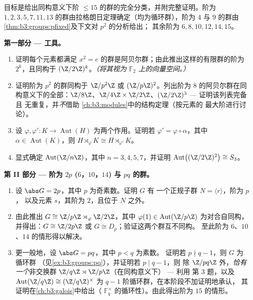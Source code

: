 \begin{problem}\label{pb:b3:groups:1}
目标是给出同构意义下阶
$\leq 15$ 的群的完全分类，并附完整证明。阶为 $1, 2, 3, 5,
7, 11, 13$ 的群由拉格朗日定理确定（均为循环群），阶为 $4$ 与
$9$ 的群由\cref{thm:b3:groups:pfixed}及下文对 $p^2$ 的分析给出；
其余阶为 $6, 8, 10, 12, 14, 15$。

\medskip
\noindent\textbf{第一部分 --- 工具。}
\begin{enumerate}
  \item 证明每个元素都满足 $x^2 =
        e$ 的群是阿贝尔群；由此推出这样的有限群的阶为
        $2^k$，且同构于 $(\Z/2\Z)^k$。\emph{（将其视为
        $\mathbb F_2$ 上的向量空间。）}
  \item 证明阶为 $p^2$ 的群同构于
        $\Z/p^2\Z$ 或 $(\Z/p\Z)^2$。列出阶为
        $8$ 的阿贝尔群在同构意义下的全部：$\Z/8\Z$、$\Z/4\Z \times
        \Z/2\Z$、$(\Z/2\Z)^3$ --- 证明该列表完备且
        无重复，并\emph{不}借助
        \cref{ch:b3:modules}中的结构定理（按元素的
        最大阶进行讨论）。
  \item 设 $\varphi, \varphi' \colon K \to \operatorname{Aut}(H)$
        为两个作用。证明若 $\varphi' = \varphi \circ
        \alpha$，其中 $\alpha \in \operatorname{Aut}(K)$，则 $H
        \rtimes_{\varphi} K \cong H \rtimes_{\varphi'} K$。
  \item 显式确定 $\operatorname{Aut}(\Z/n\Z)$，其中 $n = 3, 4, 5,
        7$，并证明 $\operatorname{Aut}\bigl((\Z/2\Z)^2
        \bigr) \cong S_3$。
\end{enumerate}

\medskip
\noindent\textbf{第 II 部分 --- 阶为 $2p$ ($6$，$10$，$14$) 与
$pq$ 的群。}
\begin{enumerate}[resume]
  \item 设 $\abs G = 2p$，其中 $p$ 为奇素数。证明 $G$ 有
        一个正规子群 $N = \langle r \rangle$，阶为 $p$，
        以及元素 $s$，其阶为 $2$，且位于 $N$ 之外。
  \item 由此推出 $G \cong \Z/p\Z \rtimes_\varphi \Z/2\Z$，其中
        $\varphi(1) \in \operatorname{Aut}(\Z/p\Z)$ 为对合自同构，
        并得出：$G \cong \Z/2p\Z$ 或 $G \cong
        D_p$；验证这两个群互不同构。
        至此阶为 $6$、$10$、$14$ 的情形得以解决。
  \item 更一般地，设 $\abs G = pq$，其中 $p < q$ 为素数。
        证明若 $p \nmid q-1$，则 $G$ 为循环群
        （见\cref{ex:b3:groups:pq}），并证明若 $p \mid q - 1$，则
        除 $\Z/pq\Z$ 外，\emph{恰有一个}非交换群
        $\Z/q\Z \rtimes \Z/p\Z$（在同构意义下） --- 利用
        第 3 题，以及 $\operatorname{Aut}(\Z/q\Z) \cong
        (\Z/q\Z)^\times$ 为 $q - 1$ 阶循环群，在本阶段不加证明地承认，
        其证明在\cref{ch:b3:galois}中给出（
        $\mathbb F_q^\times$ 的循环性）。由此得出阶为 $15$ 的情形。
\end{enumerate}


\end{problem}
